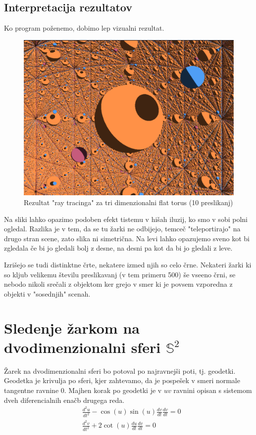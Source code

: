 \documentclass[titlepage]{article}
\begin{document}
\newpage
\subsection{Interpretacija rezultatov}
Ko program poženemo, dobimo lep vizualni rezultat.
\begin{figure}[H]
    \centering
    \includegraphics[width=0.7\linewidth]{Images/flat_torus_blaz.png}
    \caption{Rezultat "ray tracinga" za tri dimenzionalni flat torus (10 preslikanj)}
    \label{Slika:Rezultat "ray tracinga" za tri dimenzionalni flat torus 1}
\end{figure}
Na sliki lahko opazimo podoben efekt tistemu v hišah iluzij, ko smo v sobi polni ogledal. Razlika je v tem, 
da se tu žarki ne odbijejo, temceč "teleportirajo" na drugo stran scene, zato slika ni simetrična. Na levi 
lahko opazujemo sveno kot bi zgledala če bi jo gledali bolj z desne, na desni pa kot da bi jo gledali z leve.

Izrišejo se tudi distinktne črte, nekatere izmed njih so celo črne. Nekateri žarki ki so kljub velikemu številu preslikavanj
(v tem primeru 500) še vseeno črni, se nebodo nikoli srečali z objektom ker grejo v smer ki je povsem vzporedna
z objekti v "sosednjih" scenah.

\section{\texorpdfstring{Sledenje žarkom na dvodimenzionalni sferi \( \mathbb{S}^2 \)}{Sledenje žarkom na dvodimenzionalni sferi}}
Žarek na dvodimenzionalni sferi bo potoval po najravnejši poti, tj. geodetki. Geodetka je krivulja po sferi, kjer zahtevamo, da je
pospešek v smeri normale tangentne ravnine 0. Majhen korak po geodetki je v \( uv \) ravnini opisan s sistemom dveh diferencialnih enačb drugega reda.
\begin{equation}
    \begin{split}
        &\frac{d^{2}u}{dt^{2}}-\cos(u)\sin(u)\frac{dv}{dt}\frac{dv}{dt}=0 \\
        &\frac{d^{2}v}{dt^{2}}+2\cot(u)\frac{du}{dt}\frac{dv}{dt}=0
    \end{split}
\end{equation}
\end{document}
